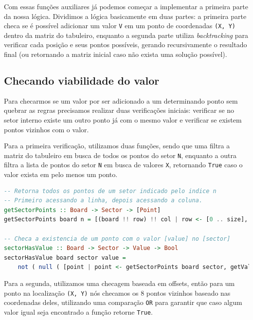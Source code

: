 \documentclass[12pt]{article}
\begin{document}
Com essas funções auxiliares já podemos começar a implementar a primeira parte da nossa lógica. Dividimos a lógica basicamente em duas partes: a primeira parte checa se é possível adicionar um valor \texttt{V} em um ponto de coordenadas \texttt{(X, Y)} dentro da matriz do tabuleiro, enquanto a segunda parte utiliza \emph{backtracking} para verificar cada posição e seus pontos possíveis, gerando recursivamente o resultado final (ou retornando a matriz inicial caso não exista uma solução possível).

\subsection{Checando viabilidade do valor}

Para checarmos se um valor por ser adicionado a um determinando ponto sem quebrar as regras precisamos realizar duas verificações iniciais: verificar se no setor interno existe um outro ponto já com o mesmo valor e verificar se existem pontos vizinhos com o valor.

Para a primeira verificação, utilizamos duas funções, sendo que uma filtra a matriz do tabuleiro em busca de todos os pontos do setor \texttt{N}, enquanto a outra filtra a lista de pontos do setor \texttt{N} em busca de valores \texttt{X}, retornando \texttt{True} caso o valor exista em pelo menos um ponto.

\begin{lstlisting}[language=Haskell]
-- Retorna todos os pontos de um setor indicado pelo indice n
-- Primeiro acessando a linha, depois acessando a coluna.
getSectorPoints :: Board -> Sector -> [Point]
getSectorPoints board n = [(board !! row) !! col | row <- [0 .. size], col <- [0 .. size], getSector ((board !! row) !! col) == n]

-- Checa a existencia de um ponto com o valor [value] no [sector]
sectorHasValue :: Board -> Sector -> Value -> Bool
sectorHasValue board sector value =
    not ( null ( [point | point <- getSectorPoints board sector, getValue point == value] ) )
\end{lstlisting}

Para a segunda, utilizamos uma checagem baseada em offsets, então para um ponto na localização \texttt{(X, Y)} nós checamos os 8 pontos vizinhos baseado nas coordenadas deles, utilizando uma comparação \texttt{OR} para garantir que caso algum valor igual seja encontrado a função retorne \texttt{True}.
\end{document}
